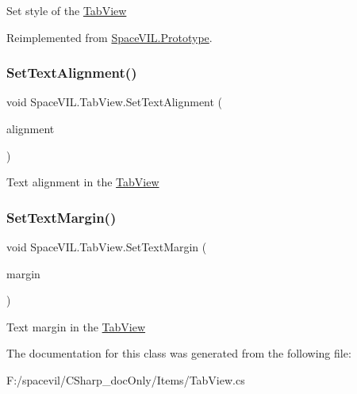 Set style of the \mbox{\hyperlink{class_space_v_i_l_1_1_tab_view}{Tab\+View}} 



Reimplemented from \mbox{\hyperlink{class_space_v_i_l_1_1_prototype_ae96644a6ace490afb376fb542161e541}{Space\+V\+I\+L.\+Prototype}}.

\mbox{\label{class_space_v_i_l_1_1_tab_view_abdd2253b42ef61e32efb3115c679bbc5}} 
\subsubsection{\texorpdfstring{Set\+Text\+Alignment()}{SetTextAlignment()}}
{\footnotesize\ttfamily void Space\+V\+I\+L.\+Tab\+View.\+Set\+Text\+Alignment (\begin{DoxyParamCaption}\item[{Item\+Alignment}]{alignment }\end{DoxyParamCaption})}



Text alignment in the \mbox{\hyperlink{class_space_v_i_l_1_1_tab_view}{Tab\+View}} 

\mbox{\label{class_space_v_i_l_1_1_tab_view_af857743fb5c8b39d4090b5ae49f7abd5}} 
\subsubsection{\texorpdfstring{Set\+Text\+Margin()}{SetTextMargin()}}
{\footnotesize\ttfamily void Space\+V\+I\+L.\+Tab\+View.\+Set\+Text\+Margin (\begin{DoxyParamCaption}\item[{\mbox{\hyperlink{struct_space_v_i_l_1_1_decorations_1_1_indents}{Indents}}}]{margin }\end{DoxyParamCaption})}



Text margin in the \mbox{\hyperlink{class_space_v_i_l_1_1_tab_view}{Tab\+View}} 



The documentation for this class was generated from the following file\+:\begin{DoxyCompactItemize}
\item 
F\+:/spacevil/\+C\+Sharp\+\_\+doc\+Only/\+Items/Tab\+View.\+cs\end{DoxyCompactItemize}
